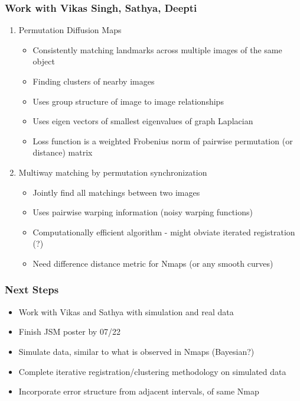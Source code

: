 \documentclass[10pt,dvipsnames,table]{beamer}
\begin{document}
\begin{frame}
\frametitle{Work with Vikas Singh, Sathya, Deepti}
\begin{enumerate}
\item Permutation Diffusion Maps
\begin{itemize}
\item Consistently matching landmarks across multiple images of the same object
\item Finding clusters of nearby images
\item Uses group structure of image to image relationships
\item Uses eigen vectors of smallest eigenvalues of graph Laplacian 
\item Loss function is a weighted Frobenius norm of pairwise permutation (or distance) matrix
\end{itemize}
\item Multiway matching by permutation synchronization
\begin{itemize}
\item Jointly find all matchings between two images
\item Uses pairwise warping information (noisy warping functions)
\item Computationally efficient algorithm - might obviate iterated registration (?)
\item Need difference distance metric for Nmaps (or any smooth curves)
\end{itemize}
\end{enumerate}
\end{frame}

\begin{frame}
\frametitle{Next Steps}
\begin{itemize}
\item Work with Vikas and Sathya with simulation and real data
\item Finish JSM poster by 07/22
\item Simulate data, similar to what is observed in Nmaps (Bayesian?)
\item Complete iterative registration/clustering methodology on simulated data
\item Incorporate error structure from adjacent intervals, of same Nmap
\end{itemize}

\end{frame}
\end{document}
